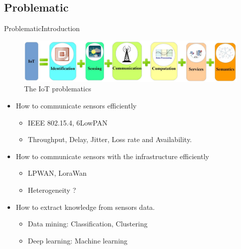 \subsection*{Problematic}
\begin{frame}{Problematic}{Introduction} %
\begin{figure}
	\includegraphics[width=.7\columnwidth]{res/iotChallenges.png}
	\caption{\label{fig:iotChallenges}The IoT problematics}
\end{figure}
\begin{itemize}
	\item How to communicate sensors efficiently
		\begin{itemize}
			\item IEEE 802.15.4, 6LowPAN
			\item Throughput, Delay, Jitter, Loss rate and Availability.
		\end{itemize}
	\item How to communicate sensors with the infrastructure efficiently
		\begin{itemize}
			\item LPWAN, LoraWan
			\item Heterogeneity ?
		\end{itemize}
	\item How to extract knowledge from sensors data.
		\begin{itemize}
			\item Data mining: Classification, Clustering
			\item Deep learning: Machine learning
		\end{itemize}
	\end{itemize}
	\end{frame}
